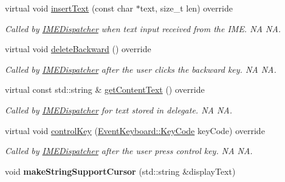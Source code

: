 \begin{DoxyCompactItemize}
virtual void \hyperlink{classTextFieldTTF_a4e56aeb374dfa1fae2191636fd97da95}{insert\+Text} (const char $\ast$text, size\+\_\+t len) override
\begin{DoxyCompactList}\small\item\em Called by \hyperlink{classIMEDispatcher}{I\+M\+E\+Dispatcher} when text input received from the I\+ME.  NA  NA. \end{DoxyCompactList}\item 
\mbox{\label{classTextFieldTTF_a9028624c85dfbe2fa1f6517776dfdb14}} 
virtual void \hyperlink{classTextFieldTTF_a9028624c85dfbe2fa1f6517776dfdb14}{delete\+Backward} () override
\begin{DoxyCompactList}\small\item\em Called by \hyperlink{classIMEDispatcher}{I\+M\+E\+Dispatcher} after the user clicks the backward key.  NA  NA. \end{DoxyCompactList}\item 
\mbox{\label{classTextFieldTTF_a64226fd923a8ac69bc1f10b0b2ee9cab}} 
virtual const std\+::string \& \hyperlink{classTextFieldTTF_a64226fd923a8ac69bc1f10b0b2ee9cab}{get\+Content\+Text} () override
\begin{DoxyCompactList}\small\item\em Called by \hyperlink{classIMEDispatcher}{I\+M\+E\+Dispatcher} for text stored in delegate.  NA  NA. \end{DoxyCompactList}\item 
\mbox{\label{classTextFieldTTF_a2b4fb6cb44151abf665993ee1273dca2}} 
virtual void \hyperlink{classTextFieldTTF_a2b4fb6cb44151abf665993ee1273dca2}{control\+Key} (\hyperlink{classEventKeyboard_a7cd3fa46515673276ce8ec7f0e051606}{Event\+Keyboard\+::\+Key\+Code} key\+Code) override
\begin{DoxyCompactList}\small\item\em Called by \hyperlink{classIMEDispatcher}{I\+M\+E\+Dispatcher} after the user press control key.  NA  NA. \end{DoxyCompactList}\item 
\mbox{\label{classTextFieldTTF_a72b8543dbed4274865196145f1a7f3b7}} 
void {\bfseries make\+String\+Support\+Cursor} (std\+::string \&display\+Text)
\item 
\mbox{\label{classTextFieldTTF_a93d030811f06078c36461d4f0029f9fe}} 

\end{DoxyCompactItemize}

